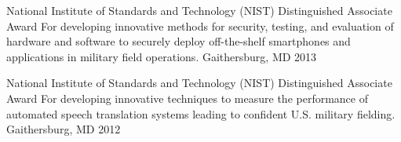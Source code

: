 

\begin{cvhonors}


\cvhonor
{National Institute of Standards and Technology (NIST)} %
{\newline Distinguished Associate Award For developing innovative methods for security, testing, and evaluation of hardware and software to securely deploy off-the-shelf smartphones and applications in military field operations.} %
{Gaithersburg, MD} %
{2013} %


\end{cvhonors}




\begin{cvhonors}


\cvhonor
{National Institute of Standards and Technology (NIST)} %
{\newline Distinguished Associate Award For developing innovative techniques to measure the performance of automated speech translation systems leading to confident U.S. military fielding.} %
{Gaithersburg, MD} %
{2012} %

\end{cvhonors}






